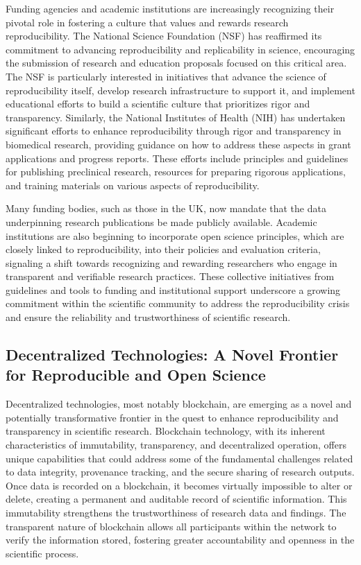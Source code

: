 \documentclass{article}
\begin{document}
Funding agencies and academic institutions are increasingly recognizing their pivotal role in fostering a culture that values and rewards research reproducibility. The National Science Foundation (NSF) has reaffirmed its commitment to advancing reproducibility and replicability in science, encouraging the submission of research and education proposals focused on this critical area. The NSF is particularly interested in initiatives that advance the science of reproducibility itself, develop research infrastructure to support it, and implement educational efforts to build a scientific culture that prioritizes rigor and transparency. Similarly, the National Institutes of Health (NIH) has undertaken significant efforts to enhance reproducibility through rigor and transparency in biomedical research, providing guidance on how to address these aspects in grant applications and progress reports. These efforts include principles and guidelines for publishing preclinical research, resources for preparing rigorous applications, and training materials on various aspects of reproducibility.

Many funding bodies, such as those in the UK, now mandate that the data underpinning research publications be made publicly available. Academic institutions are also beginning to incorporate open science principles, which are closely linked to reproducibility, into their policies and evaluation criteria, signaling a shift towards recognizing and rewarding researchers who engage in transparent and verifiable research practices. These collective initiatives from guidelines and tools to funding and institutional support underscore a growing commitment within the scientific community to address the reproducibility crisis and ensure the reliability and trustworthiness of scientific research.

\subsection{Decentralized Technologies: A Novel Frontier for Reproducible and Open Science}

Decentralized technologies, most notably blockchain, are emerging as a novel and potentially transformative frontier in the quest to enhance reproducibility and transparency in scientific research. Blockchain technology, with its inherent characteristics of immutability, transparency, and decentralized operation, offers unique capabilities that could address some of the fundamental challenges related to data integrity, provenance tracking, and the secure sharing of research outputs. Once data is recorded on a blockchain, it becomes virtually impossible to alter or delete, creating a permanent and auditable record of scientific information. This immutability strengthens the trustworthiness of research data and findings. The transparent nature of blockchain allows all participants within the network to verify the information stored, fostering greater accountability and openness in the scientific process.
\end{document}
